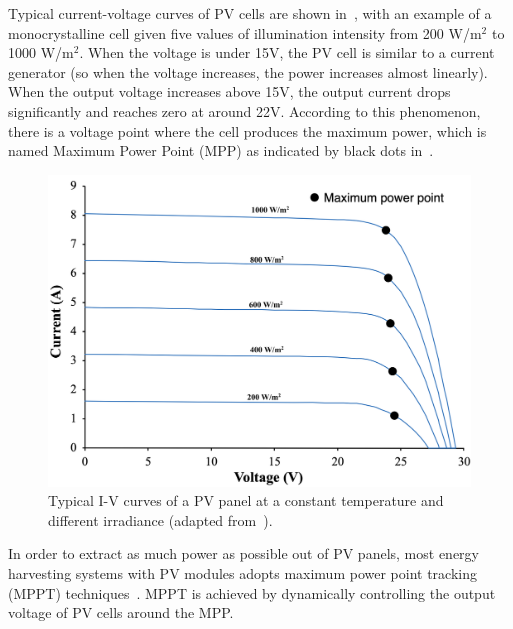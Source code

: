 Typical current-voltage curves of PV cells are shown in~, with an example of a monocrystalline cell given five values of illumination intensity from 200 W/m$^{2}$ to 1000 W/m$^{2}$. When the voltage is under 15V, the PV cell is similar to a current generator (so when the voltage increases, the power increases almost linearly). When the output voltage increases above 15V, the output current drops significantly and reaches zero at around 22V. According to this phenomenon, there is a voltage point where the cell produces the maximum power, which is named Maximum Power Point (MPP) as indicated by black dots in~. 

\begin{figure}
    \centering
    \includegraphics[width=0.9\columnwidth]{ch2_review/figures/solar_iv_pic.png}
    \caption[Typical I-V curves of a PV panel at a constant temperature and different irradiance.]{Typical I-V curves of a PV panel at a constant temperature and different irradiance (adapted from~\cite{ciulla2014comparison}\footnotemark).}
    \label{Figure:solar_vi}
\end{figure}

In order to extract as much power as possible out of PV panels, most energy harvesting systems with PV modules adopts maximum power point tracking (MPPT) techniques~\cite{lopez2010new, paz2016high, verma2016maximum}. MPPT is achieved by dynamically controlling the output voltage of PV cells around the MPP.

